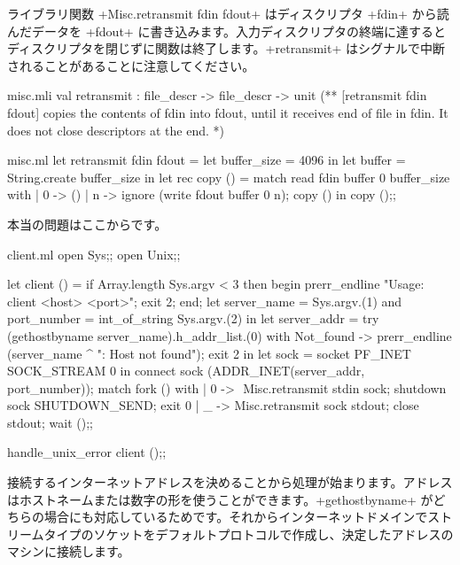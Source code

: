 ライブラリ関数 \ml+Misc.retransmit fdin fdout+ はディスクリプタ \ml+fdin+ から読んだデータを \ml+fdout+ に書き込みます。入力ディスクリプタの終端に達するとディスクリプタを閉じずに関数は終了します。\ml+retransmit+ はシグナルで中断されることがあることに注意してください。
\begin{codefile}{misc.mli}
val retransmit : file_descr -> file_descr -> unit
(** [retransmit fdin fdout] copies the contents of fdin into fdout, until
it receives end of file in fdin. It does not close descriptors at the
end. *)
\end{codefile}
\begin{listingcodefile}{misc.ml}
let retransmit fdin fdout =
  let buffer_size = 4096 in
  let buffer = String.create buffer_size in
  let rec copy () = match read fdin buffer 0 buffer_size with
    | 0 -> ()
    | n -> ignore (write fdout buffer 0 n); copy ()
  in
  copy ();;
\end{listingcodefile}
本当の問題はここからです。
\begin{listingcodefile}[style=numbers]{client.ml}
open Sys;;
open Unix;;

let client () =
  if Array.length Sys.argv < 3 then begin
    prerr_endline "Usage: client <host> <port>";
    exit 2;
  end;
  let server_name = Sys.argv.(1)
  and port_number = int_of_string Sys.argv.(2) in
  let server_addr =
    try (gethostbyname server_name).h_addr_list.(0)
    with Not_found ->
      prerr_endline (server_name ^ ": Host not found");
      exit 2 in
  let sock = socket PF_INET SOCK_STREAM 0 in
  connect sock (ADDR_INET(server_addr, port_number));
  match fork () with
  | 0 -> $\label{prog:add_signal_ignore}$
      Misc.retransmit stdin sock;
      shutdown sock SHUTDOWN_SEND;
      exit 0
  | _ ->
      Misc.retransmit sock stdout;
      close stdout;
      wait ();;

handle_unix_error client ();;
\end{listingcodefile}

接続するインターネットアドレスを決めることから処理が始まります。アドレスはホストネームまたは数字の形を使うことができます。\ml+gethostbyname+ がどちらの場合にも対応しているためです。それからインターネットドメインでストリームタイプのソケットをデフォルトプロトコルで作成し、決定したアドレスのマシンに接続します。

